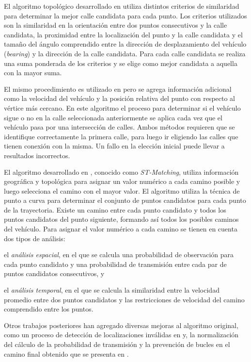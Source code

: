 El algoritmo topológico desarrollado en \cite{greenfeld2002matching} utiliza distintos criterios de similaridad para determinar la mejor calle candidata para cada punto. Los criterios utilizados son la similaridad en la orientación entre dos puntos consecutivos y la calle candidata, la proximidad entre la localización del punto y la calle candidata y el tamaño del ángulo comprendido entre la dirección de desplazamiento del vehículo (\emph{bearing}) y la dirección de la calle candidata. Para cada calle candidata se realiza una suma ponderada de los criterios y se elige como mejor candidata a aquella con la mayor suma.

El mismo procedimiento es utilizado en \cite{quddus2003general} pero se agrega información adicional como la velocidad del vehículo y la posición relativa del punto con respecto al vértice más cercano. En este algoritmo el proceso para determinar si el vehículo sigue o no en la calle seleccionada anteriormente se aplica cada vez que el vehículo pasa por una intersección de calles. Ambos métodos requieren que se identifique correctamente la primera calle, para luego ir eligiendo las calles que tienen conexión con la misma. Un fallo en la elección inicial puede llevar a resultados incorrectos.

El algoritmo desarrollado en \cite{lou2009map}, conocido como \emph{ST-Matching}, utiliza información geográfica y topológica para asignar un valor numérico a cada camino posible y luego selecciona el camino con el mayor valor. El algoritmo utiliza la técnica de punto a curva para determinar el conjunto de puntos candidatos para cada punto de la trayectoria. Existe un camino entre cada punto candidato y todos los puntos candidatos del punto siguiente, formando así todos los posibles caminos del vehículo. Para asignar el valor numérico a cada camino se tienen en cuenta dos tipos de análisis: \begin{enumerate*}[a)] \item el \emph{análisis espacial}, en el que se calcula una probabilidad de observación para cada punto candidato y una probabilidad de transmisión entre cada par de puntos candidatos consecutivos, y \item el \emph{análisis temporal}, en el que se calcula la similaridad entre la velocidad promedio entre dos puntos candidatos y las restricciones de velocidad del camino comprendido entre los puntos.\end{enumerate*} Otros trabajos posteriores han agregado diversas mejoras al algoritmo original, como un proceso de detección de localizaciones inválidas en  \cite{sakic2012map} y, la normalización del cálculo de la probabilidad de transmisión y la prevención de bucles en el camino final obtenido que se presenta en  \cite{budigm2012algorithm}.

